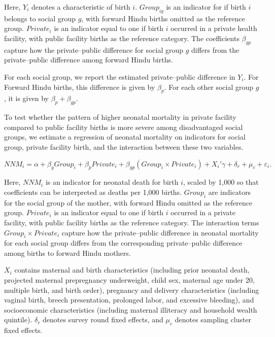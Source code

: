 \documentclass[12pt]{article}
\begin{document}
Here, \(Y_i\) denotes a characteristic of birth \(i\). \(Group_{ig}\) is an indicator for if birth \(i\) belongs to social group \(g\), with forward Hindu births omitted as the reference group. \(Private_i\) is an indicator equal to one if birth \(i\) occurred in a private health facility, with public facility births as the reference category. The coefficients \(\beta_{gp}\) capture how the private--public difference for social group \(g\) differs from the private--public difference among forward Hindu births.

For each social group, we report the estimated private--public difference in \(Y_i\). For Forward Hindu births, this difference is given by \(\beta_p\). For each other social group \(g\), it is given by \(\beta_p + \beta_{gp}\). 

To test whether the pattern of higher neonatal mortality in private facility compared to public facility births is more severe among disadvantaged social groups, we estimate a regression of neonatal mortality on indicators for social group, private facility birth, and the interaction between these two variables.

\begin{equation}
NNM_i = \alpha + \beta_g Group_i + \beta_p Private_i
+ \beta_{gp}(Group_i \times Private_i)
+ X_i'\gamma + \delta_r + \mu_c + \varepsilon_i.
\end{equation}

Here, \(NNM_i\) is an indicator for neonatal death for birth \(i\), scaled by 1,000 so that coefficients can be interpreted as deaths per 1,000 births. \(Group_i\) are indicators for the social group of the mother, with forward Hindu omitted as the reference group. \(Private_i\) is an indicator equal to one if birth \(i\) occurred in a private facility, with public facility births as the reference category. The interaction terms \(Group_i \times Private_i\) capture how the private--public difference in neonatal mortality for each social group differs from the corresponding private--public difference among births to forward Hindu mothers.

\(X_i\) contains maternal and birth characteristics (including prior neonatal death, projected maternal prepregnancy underweight, child sex, maternal age under 20, multiple birth, and birth order), pregnancy and delivery characteristics (including vaginal birth, breech presentation, prolonged labor, and excessive bleeding), and socioeconomic characteristics (including maternal illiteracy and household wealth quintile). \(\delta_r\) denotes survey round fixed effects, and \(\mu_c\) denotes sampling cluster fixed effects.
\end{document}
